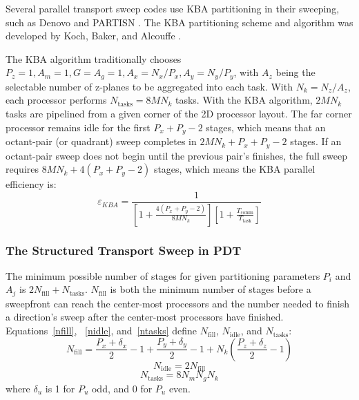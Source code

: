 \documentclass{anstrans}
\begin{document}
Several parallel transport sweep codes use KBA partitioning in their sweeping, such as Denovo \cite{denovo} and PARTISN \cite{partisn}. The KBA partitioning scheme and algorithm was developed by Koch, Baker, and Alcouffe \cite{partisn}.

The KBA algorithm traditionally chooses $P_z = 1, A_m = 1, G = A_g = 1, A_x = N_x/P_x, A_y = N_y/P_y$, with $A_z$ being the selectable number of z-planes to be aggregated into each task. With $N_k = N_z/A_z$, each processor performs $N_{\text{tasks}} = 8MN_k$ tasks. With the KBA algorithm, $2MN_k$ tasks are pipelined from a given corner of the 2D processor layout. The far corner processor remains idle for the first $P_x + P_y - 2 $ stages, which means that an octant-pair (or quadrant) sweep completes in $2MN_k + P_x + P_y - 2$ stages. If an octant-pair sweep does not begin until the previous pair's finishes, the full sweep requires $8MN_k + 4(P_x+P_y-2)$ stages, which means the KBA parallel efficiency is:
\begin{equation}
\varepsilon_{KBA} = \frac{1}{[1+\frac{4(P_x+P_y-2)}{8MN_k}][1+\frac{T_{\text{comm}}}{T_{\text{task}}}]}
\label{eKBA}
\end{equation}

\subsubsection{The Structured Transport Sweep in PDT}
The minimum possible number of stages for given partitioning parameters $P_i$ and $A_j$ is $2 N_{\text{fill}}+N_{\text{tasks}}$. $N_{\text{fill}}$ is both the minimum number of stages before a sweepfront can reach the center-most processors and the number needed to finish a direction's sweep after the center-most processors have finished. Equations~\eqref{nfill}, ~\eqref{nidle}, and~\eqref{ntasks} define $N_{\text{fill}}$, $N_{\text{idle}}$, and $N_{\text{tasks}}$:
\begin{equation}
N_{\text{fill}} = \frac{P_x + \delta_x}{2} - 1 + \frac{P_y + \delta_y}{2} - 1 + N_k (\frac{P_z + \delta_z}{2} - 1)
\label{nfill}
\end{equation}
\begin{equation}
N_{\text{idle}} = 2 N_{\text{fill}}
\label{nidle}
\end{equation}
\begin{equation}
N_{\text{tasks}} = 8 N_m N_g N_k
\label{ntasks}
\end{equation}
where $\delta_u$ is 1 for $P_u$ odd, and 0 for $P_u$ even.
\end{document}
